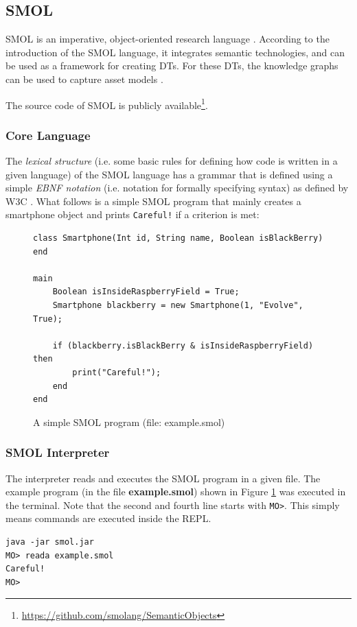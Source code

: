 \documentclass{article}
\begin{document}
\subsection{SMOL}\label{subsec:SMOL}
SMOL is an imperative, object-oriented research language \cite{noauthor_smol_nodate-1}. According to the introduction of the SMOL language, it integrates semantic technologies, and can be used as a framework for creating DTs. For these DTs, the knowledge graphs can be used to capture asset models \cite{noauthor_introduction_nodate}.

The source code of SMOL is publicly available\footnote{\url{https://github.com/smolang/SemanticObjects}}.

\subsubsection{Core Language} 
The \emph{lexical structure} (i.e. some basic rules for defining how code is written in a given language) of the SMOL language has a grammar that is defined using a simple \emph{EBNF notation} (i.e. notation for formally specifying syntax) as defined by W3C \cite{noauthor_lexical_nodate, noauthor_ebnf_nodate}. What follows is a simple SMOL program that mainly creates a smartphone object and prints \verb|Careful!| if a criterion is met:

\begin{figure}[H]
    \centering
    \caption{A simple SMOL program (file: example.smol)}
    \label{fig:smol_program}
    \begin{Verbatim}[frame=single]
class Smartphone(Int id, String name, Boolean isBlackBerry) end

main
    Boolean isInsideRaspberryField = True;
    Smartphone blackberry = new Smartphone(1, "Evolve", True);

    if (blackberry.isBlackBerry & isInsideRaspberryField) then
        print("Careful!");
    end
end

    \end{Verbatim}
\end{figure}

\subsubsection{SMOL Interpreter}

The interpreter reads and executes the SMOL program in a given file. The example program (in the file \textbf{example.smol}) shown in Figure \ref{fig:smol_program} was executed in the terminal. Note that the second and fourth line starts with \verb|MO>|. This simply means commands are executed inside the REPL.
\begin{Verbatim}[frame=single]
java -jar smol.jar
MO> reada example.smol
Careful!
MO>
\end{Verbatim}
\end{document}
